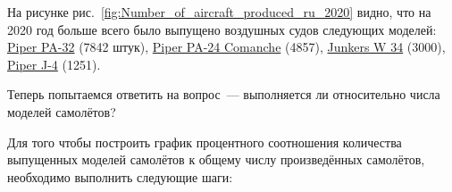 \newpage
На рисунке рис.~\ref{fig:Number_of_aircraft_produced_ru_2020} видно, что на 2020 год больше всего было выпущено воздушных судов следующих моделей: \href{https://www.wikidata.org/wiki/Q2096452}{Piper PA-32} (\num{7842} штук), \href{https://www.wikidata.org/wiki/Q1860367}{Piper PA-24 Comanche} (\num{4857}), \href{https://www.wikidata.org/wiki/Q694521}{Junkers W 34} (\num{3000}), \href{https://www.wikidata.org/wiki/Q4046989}{Piper J-4} (\num{1251}).

\begin{figure*}[h!]
    \setlength{\fboxsep}{0pt}%
    \setlength{\fboxrule}{1pt}%
	\caption[Количество выпущенных воздушных судов по моделям, 2020 год.]{Количество выпущенных воздушных судов по моделям, 2020. Диаграмма построена в Microsoft Excel на основе данных, полученных с помощью запроса~\protect\ref{lst:lang3_1}.}%
    \label{fig:Number_of_aircraft_produced_ru_2020}%
\end{figure*}


\newpage 
Теперь 
 попытаемся ответить на вопрос~--- выполняется ли  относительно числа моделей самолётов?

Для того чтобы построить график процентного соотношения количества выпущенных моделей самолётов к общему числу произведённых самолётов, необходимо выполнить следующие шаги:

